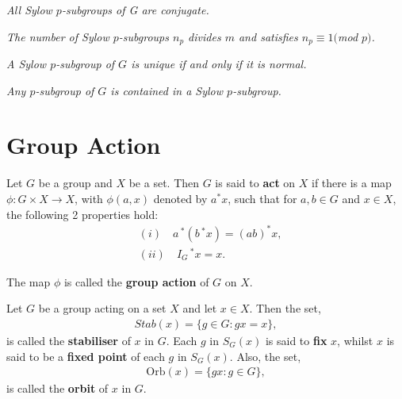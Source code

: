 \begin{theorem}
\leanok
\textit{All Sylow $p$-subgroups of G are conjugate.} \\
\end{theorem}

\begin{theorem}
\leanok
\textit{The number of Sylow $p$-subgroups $n_p$ divides $m$ and satisfies $n_p \equiv 1 ($mod $p)$.} \\
\end{theorem}

\begin{corollary}
\label{Sylow.unique_of_normal}
\leanok    
 \textit{A Sylow $p$-subgroup of $G$ is unique if and only if it is normal.} \\
\end{corollary}

\begin{corollary}
\label{IsPGroup.exists_le_sylow}
\leanok
\textit{Any $p$-subgroup of $G$ is contained in a Sylow $p$-subgroup.} \\
\end{corollary}

\section{Group Action}

\begin{definition} Let $G$ be a group and $X$ be a set. Then $G$ is said to \textbf{act} on $X$ if there is a map $\phi : G \times X \rightarrow X$, with $\phi(a,x)$ denoted by $a^*x$, such that for $a,b \in G$ and $x \in X$, the following 2 properties hold:
\begin{align*} &(i) \quad a\,^*(b\,^*x) = (ab)^*x,
\\  &(ii) \quad I_G\,^*x = x.
\end{align*}

The map $\phi$ is called the \textbf{group action} of $G$ on $X$.
\end{definition}

\begin{definition} Let $G$ be a group acting on a set $X$ and let $x \in X$. Then the set,
\begin{align*} Stab(x) = \{ g \in G  :  gx = x \},
\end{align*}
is called the \textbf{stabiliser} of $x$ in $G$. Each $g$ in $S_G(x)$ is said to \textbf{fix} $x$, whilst $x$ is said to be a \textbf{fixed point} of each $g$ in $S_G(x)$. Also, the set,
\begin{align*} \text{Orb}(x) = \{ gx : g \in G \},
\end{align*}
is called the \textbf{orbit} of $x$ in $G$.  
\end{definition} 


